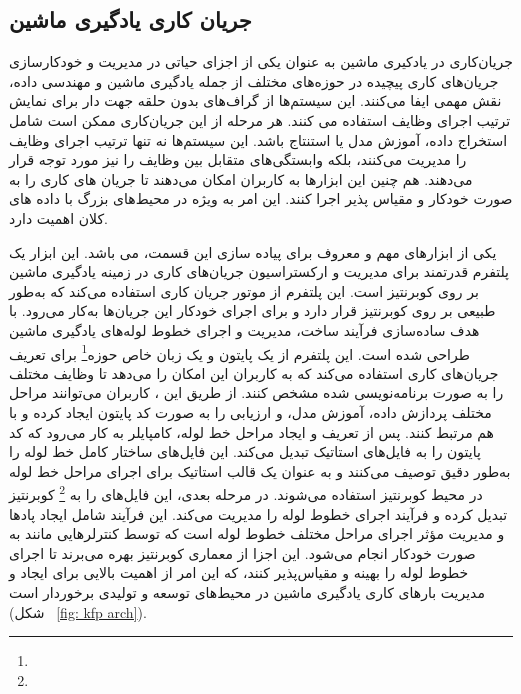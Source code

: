 \subsection{جریان کاری یادگیری ماشین}
جریان‌کاری در یادکیری ماشین به عنوان یکی از اجزای حیاتی در مدیریت و خودکارسازی جریان‌های کاری پیچیده در حوزه‌های مختلف از جمله یادگیری ماشین و مهندسی داده، نقش مهمی ایفا می‌کنند. این سیستم‌ها از گراف‌های بدون حلقه جهت دار برای نمایش ترتیب اجرای وظایف استفاده می کنند. هر مرحله از این جریان‌کاری ممکن است شامل استخراج داده، آموزش مدل یا استنتاج باشد. این سیستم‌ها نه تنها ترتیب اجرای وظایف را مدیریت می‌کنند، بلکه وابستگی‌های متقابل بین وظایف را نیز مورد توجه قرار می‌دهند. هم چنین این ابزارها به کاربران امکان می‌دهند تا جریان های کاری را به صورت خودکار و مقیاس ‌پذیر اجرا کنند. این امر به ویژه در محیط‌های بزرگ با داده های کلان اهمیت دارد.

یکی از ابزارهای مهم و معروف برای پیاده سازی این قسمت،‌  می باشد. این ابزار یک پلتفرم قدرتمند برای مدیریت و ارکستراسیون جریان‌های کاری در زمینه یادگیری ماشین بر روی کوبرنتیز است. این پلتفرم از موتور جریان کاری  استفاده می‌کند که به‌طور طبیعی بر روی کوبرنتیز قرار دارد و برای اجرای خودکار این جریان‌ها به‌کار می‌رود.  با هدف ساده‌سازی فرآیند ساخت، مدیریت و اجرای خطوط لوله‌های یادگیری ماشین طراحی شده است. این پلتفرم از یک  پایتون و یک زبان خاص حوزه\footnote{} برای تعریف جریان‌های کاری استفاده می‌کند که به کاربران این امکان را می‌دهد تا وظایف مختلف را به صورت برنامه‌نویسی شده مشخص کنند. از طریق این ، کاربران می‌توانند مراحل مختلف پردازش داده، آموزش مدل، و ارزیابی را به صورت کد پایتون ایجاد کرده و با هم مرتبط کنند. پس از تعریف و ایجاد مراحل خط لوله، کامپایلر  به کار می‌رود که کد پایتون را به فایل‌های  استاتیک تبدیل می‌کند. این فایل‌های  ساختار کامل خط لوله را به‌طور دقیق توصیف می‌کنند و به عنوان یک قالب استاتیک برای اجرای مراحل خط لوله در محیط کوبرنتیز استفاده می‌شوند.  در مرحله بعدی، این فایل‌های  را به \footnote{} کوبرنتیز تبدیل کرده و فرآیند اجرای خطوط لوله را مدیریت می‌کند. این فرآیند شامل ایجاد پادها و مدیریت مؤثر اجرای مراحل مختلف خطوط لوله است که توسط کنترلرهایی مانند  به صورت خودکار انجام می‌شود. این اجزا از معماری کوبرنتیز بهره می‌برند تا اجرای خطوط لوله را بهینه و مقیاس‌پذیر کنند، که این امر از اهمیت بالایی برای ایجاد و مدیریت بارهای کاری یادگیری ماشین در محیط‌های توسعه و تولیدی برخوردار است (شکل ~\ref{fig: kfp arch}).  

